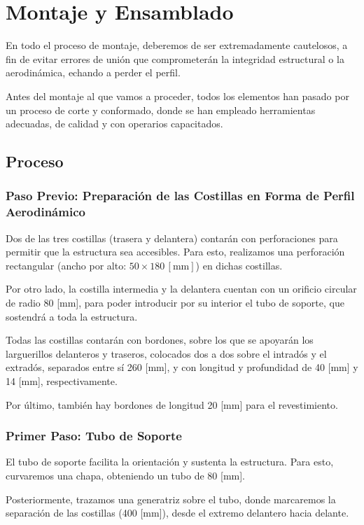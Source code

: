 \chapter{Montaje y Ensamblado}
En todo el proceso de montaje, deberemos de ser extremadamente cautelosos, a fin de evitar errores de unión que comprometerán la integridad estructural o la aerodinámica, echando a perder el perfil.

Antes del montaje al que vamos a proceder, todos los elementos han pasado por un proceso de corte y conformado, donde se han empleado herramientas adecuadas, de calidad y con operarios capacitados.

\section{Proceso}

\subsection{Paso Previo: Preparación de las Costillas en Forma de Perfil Aerodinámico}
Dos de las tres costillas (trasera y delantera) contarán con perforaciones para permitir que la estructura sea accesibles. Para esto, realizamos una perforación rectangular (ancho por alto: $50\times180 \, [\text{mm}]$) en dichas costillas.

Por otro lado, la costilla intermedia y la delantera cuentan con un orificio circular de radio 80 [mm], para poder introducir por su interior el tubo de soporte, que sostendrá a toda la estructura.

Todas las costillas contarán con bordones, sobre los que se apoyarán los larguerillos delanteros y traseros, colocados dos a dos sobre el intradós y el extradós, separados entre sí 260 [mm], y con longitud y profundidad de 40 [mm] y 14 [mm], respectivamente.

Por último, también hay bordones de longitud 20 [mm] para el revestimiento.

\subsection{Primer Paso: Tubo de Soporte}
El tubo de soporte facilita la orientación y sustenta la estructura. Para esto, curvaremos una chapa, obteniendo un tubo de 80 [mm].

Posteriormente, trazamos una generatriz sobre el tubo, donde marcaremos la separación de las costillas (400 [mm]), desde el extremo delantero hacia delante.


